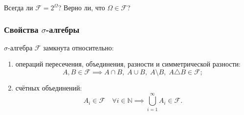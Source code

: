 \begin{exercise}
    Всегда ли $\mathcal{F} = 2^{\Omega}$?
    Верно ли, что $\Omega \in \mathcal{F}$?
\end{exercise}

\subsubsection{Свойства $\sigma$-алгебры}
\begin{exercise}
    $\sigma$-алгебра $\mathcal{F}$ замкнута относительно:
    \begin{enumerate}[label=\arabic*)]
        \item операций пересечения, объединения, разности
        и симметрической разности:
        \[
            A, B \in \mathcal{F}
            \implies
            A \cap B,\;
            A \cup B,\;
            A \setminus B,\;
            A \triangle B
            \in \mathcal{F};
        \]
        \item счётных объединений:
        \[
            A_i \in \mathcal{F}
            \quad \forall i \in \mathbb{N}
            \implies
            \bigcup_{i=1}^{\infty} A_i \in \mathcal{F}.
        \]
    \end{enumerate}
\end{exercise}


